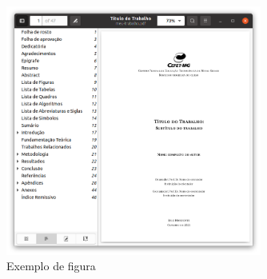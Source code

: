 \begin{apendicesenv}
    \begin{figure}[!htb]
        \centering
        \caption{Exemplo de figura}
        \label{fig_figura_exemplo}
        \includegraphics[width=0.75\textwidth]{figuras/figura_exemplo.png}
    \end{figure}


\end{apendicesenv}
